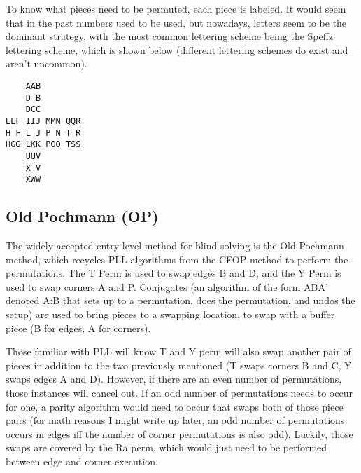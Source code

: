 \documentclass{article}
\begin{document}
To know what pieces need to be permuted, each piece is labeled. It would seem that in the past numbers used to be used, but nowadays, letters seem to be the dominant strategy, with the most common lettering scheme being the Speffz lettering scheme, which is shown below (different lettering schemes do exist and aren't uncommon).

\begin{lstlisting}
    AAB
    D B
    DCC
EEF IIJ MMN QQR
H F L J P N T R
HGG LKK POO TSS
    UUV
    X V
    XWW
\end{lstlisting}

\subsection{Old Pochmann (OP)}
The widely accepted entry level method for blind solving is the Old Pochmann method, which recycles PLL algorithms from the CFOP method to perform the permutations. The T Perm is used to swap edges B and D, and the Y Perm is used to swap corners A and P. Conjugates (an algorithm of the form ABA' denoted A:B that sets up to a permutation, does the permutation, and undos the setup) are used to bring pieces to a swapping location, to swap with a buffer piece (B for edges, A for corners).

Those familiar with PLL will know T and Y perm will also swap another pair of pieces in addition to the two previously mentioned (T swaps corners B and C, Y swaps edges A and D). However, if there are an even number of permutations, those instances will cancel out. If an odd number of permutations needs to occur for one, a parity algorithm would need to occur that swaps both of those piece pairs (for math reasons I might write up later, an odd number of permutations occurs in edges iff the number of corner permutations is also odd). Luckily, those swaps are covered by the Ra perm, which would just need to be performed between edge and corner execution.
\end{document}
